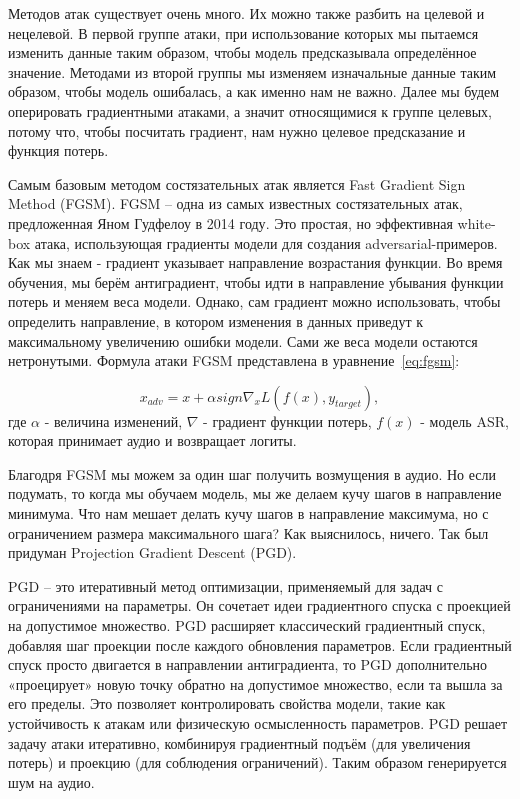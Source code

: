 Методов атак существует очень много.
Их можно также разбить на целевой и нецелевой.
В первой группе атаки, при использование которых мы пытаемся изменить данные таким образом, чтобы модель предсказывала определённое значение.
Методами из второй группы мы изменяем изначальные данные таким образом, чтобы модель ошибалась, а как именно нам не важно.
Далее мы будем оперировать градиентными атаками, а значит относящимися к группе целевых, потому что, чтобы посчитать градиент, нам нужно целевое предсказание и функция потерь.

Самым базовым методом состязательных атак является Fast Gradient Sign Method (FGSM).
FGSM -- одна из самых известных состязательных атак, предложенная Яном Гудфелоу в 2014 году\cite{goodfellow2014explaining}.
Это простая, но эффективная white-box атака, использующая градиенты модели для создания adversarial-примеров.
Как мы знаем - градиент указывает направление возрастания функции.
Во время обучения, мы берём антиградиент, чтобы идти в направление убывания функции потерь и меняем веса модели.
Однако, сам градиент можно использовать, чтобы определить направление, в котором изменения в данных приведут к максимальному увеличению ошибки модели.
Сами же веса модели остаются нетронутыми.
Формула атаки FGSM представлена в уравнение~\ref{eq:fgsm}:

\begin{equation}
  x_{adv} = x + \alpha sign \nabla_x L(f(x), y_{target}),
  \label{eq:fgsm}
\end{equation}
где $\alpha$ - величина изменений, $\nabla$ - градиент функции потерь, $f(x)$ - модель ASR, которая принимает аудио и возвращает логиты.

Благодря FGSM мы можем за один шаг получить возмущения в аудио.
Но если подумать, то когда мы обучаем модель, мы же делаем кучу шагов в направление минимума.
Что нам мешает делать кучу шагов в направление максимума, но с ограничением размера максимального шага?
Как выяснилось, ничего.
Так был придуман Projection Gradient Descent (PGD)\cite{madry2017towards}.

PGD -- это итеративный метод оптимизации, применяемый для задач с ограничениями на параметры.
Он сочетает идеи градиентного спуска с проекцией на допустимое множество.
PGD расширяет классический градиентный спуск, добавляя шаг проекции после каждого обновления параметров.
Если градиентный спуск просто двигается в направлении антиградиента, то PGD дополнительно «проецирует» новую точку обратно на допустимое множество, если та вышла за его пределы.
Это позволяет контролировать свойства модели, такие как устойчивость к атакам или физическую осмысленность параметров.
PGD решает задачу атаки итеративно, комбинируя градиентный подъём (для увеличения потерь) и проекцию (для соблюдения ограничений).
Таким образом генерируется шум на аудио.

